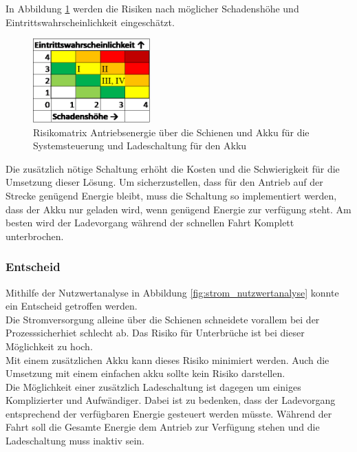 \documentclass[../../../main.tex]{subfiles}
\begin{document}
    In Abbildung \ref{fig:strom_risikomatrix_akku_mitladung} werden die Risiken nach möglicher Schadenshöhe und Eintrittswahrscheinlichkeit eingeschätzt.

    \begin{figure}[H]
        \centering
        \includegraphics[width=0.4\textwidth]{Strom_Risiko_Akku_Ladung.png}
        \caption {Risikomatrix Antriebsenergie über die Schienen und Akku für die Systemsteuerung und Ladeschaltung für den Akku}
        \label{fig:strom_risikomatrix_akku_mitladung}
    \end{figure}

    Die zusätzlich nötige Schaltung erhöht die Kosten und die Schwierigkeit für die Umsetzung dieser Lösung. Um sicherzustellen, dass für den Antrieb auf der Strecke genügend Energie bleibt, muss die Schaltung so implementiert werden, dass der Akku nur geladen wird, wenn genügend Energie zur verfügung steht. Am besten wird der Ladevorgang während der schnellen Fahrt Komplett unterbrochen.

    
    \subsubsection{Entscheid}
    Mithilfe der Nutzwertanalyse in Abbildung \ref{fig:strom_nutzwertanalyse} konnte ein Entscheid getroffen werden.\\
    Die Stromversorgung alleine über die Schienen schneidete vorallem bei der Prozesssicherhiet schlecht ab. Das Risiko für Unterbrüche ist bei dieser Möglichkeit zu hoch.\\
    Mit einem zusätzlichen Akku kann dieses Risiko  minimiert werden. Auch die Umsetzung mit einem einfachen akku sollte kein Risiko darstellen.\\
    Die Möglichkeit einer zusätzlich Ladeschaltung ist dagegen um einiges Komplizierter und Aufwändiger. Dabei ist zu bedenken, dass der Ladevorgang entsprechend der verfügbaren Energie gesteuert werden müsste. Während der Fahrt soll die Gesamte Energie dem Antrieb zur Verfügung stehen und die Ladeschaltung muss inaktiv sein.
        
\end{document}
